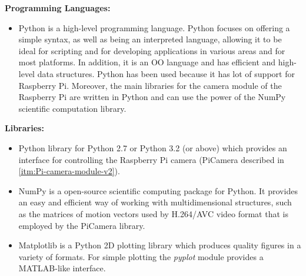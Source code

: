 \textbf{Programming Languages:}
\begin{itemize}
	\item {} Python is a high-level programming language. Python focuses on offering a simple syntax, as well as being an interpreted language, allowing it to be ideal for scripting and for developing applications in various areas and for most platforms. In addition, it is an \ac{OO} language and has efficient and high-level data structures. Python has been used because it has lot of support for Raspberry Pi. Moreover, the main libraries for the camera module of the Raspberry Pi are written in Python and can use the power of the NumPy scientific computation library.
	
\end{itemize}

\textbf{Libraries:}
\begin{itemize}
	\item {} Python library for Python 2.7 or Python 3.2 (or above) which provides an interface for controlling the Raspberry Pi camera (PiCamera described in \ref{itm:Pi-camera-module-v2}).
	
	\item {} NumPy is a open-source scientific computing package for Python. It provides an easy and efficient way of working with multidimensional structures, such as the matrices of motion vectors used by H.264/AVC video format that is employed by the PiCamera library.
	
	\item {} Matplotlib is a Python 2D plotting library which produces quality figures in a variety of formats. For simple plotting the \emph{pyplot} module provides a MATLAB-like interface.
	
\end{itemize}


